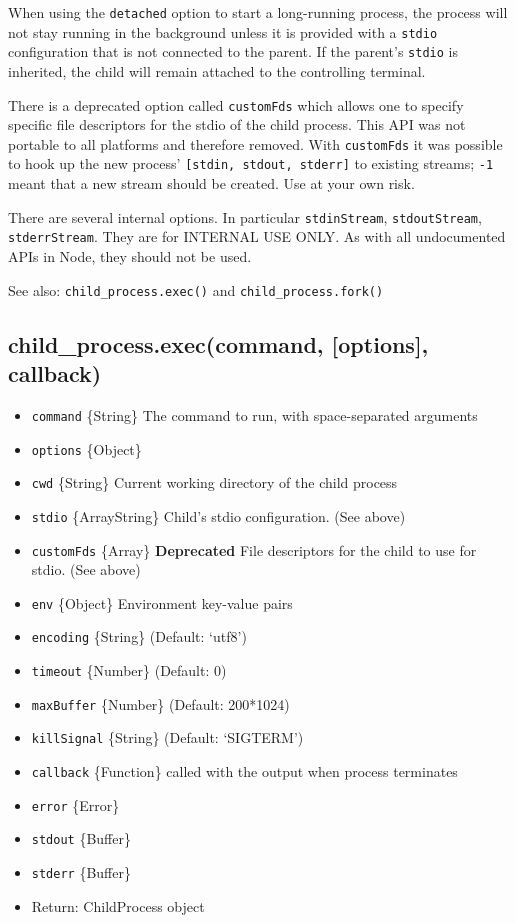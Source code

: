 When using the \texttt{detached} option to start a long-running process,
the process will not stay running in the background unless it is
provided with a \texttt{stdio} configuration that is not connected to
the parent. If the parent's \texttt{stdio} is inherited, the child will
remain attached to the controlling terminal.

There is a deprecated option called \texttt{customFds} which allows one
to specify specific file descriptors for the stdio of the child process.
This API was not portable to all platforms and therefore removed. With
\texttt{customFds} it was possible to hook up the new process'
\texttt{{[}stdin, stdout, stderr{]}} to existing streams; \texttt{-1}
meant that a new stream should be created. Use at your own risk.

There are several internal options. In particular \texttt{stdinStream},
\texttt{stdoutStream}, \texttt{stderrStream}. They are for INTERNAL USE
ONLY. As with all undocumented APIs in Node, they should not be used.

See also: \texttt{child\_process.exec()} and
\texttt{child\_process.fork()}

\subsection{child\_process.exec(command, {[}options{]}, callback)}

\begin{itemize}
\item
  \texttt{command} \{String\} The command to run, with space-separated
  arguments
\item
  \texttt{options} \{Object\}
\item
  \texttt{cwd} \{String\} Current working directory of the child process
\item
  \texttt{stdio} \{Array\textbar{}String\} Child's stdio configuration.
  (See above)
\item
  \texttt{customFds} \{Array\} \textbf{Deprecated} File descriptors for
  the child to use for stdio. (See above)
\item
  \texttt{env} \{Object\} Environment key-value pairs
\item
  \texttt{encoding} \{String\} (Default: `utf8')
\item
  \texttt{timeout} \{Number\} (Default: 0)
\item
  \texttt{maxBuffer} \{Number\} (Default: 200*1024)
\item
  \texttt{killSignal} \{String\} (Default: `SIGTERM')
\item
  \texttt{callback} \{Function\} called with the output when process
  terminates
\item
  \texttt{error} \{Error\}
\item
  \texttt{stdout} \{Buffer\}
\item
  \texttt{stderr} \{Buffer\}
\item
  Return: ChildProcess object
\end{itemize}

